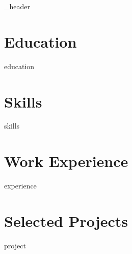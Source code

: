 \documentclass[letter,10pt]{article}
\author{Nicholas Pysklywec}
\begin{document}
{_header}
\vspace*{10pt}

\section{Education}
{education}
\vspace*{10pt}

\section{Skills}
\vspace*{3pt}
{skills}
\vspace*{10pt}
\section{Work Experience}
{experience}
\vspace*{10pt}

\newpage 

\section{Selected Projects}
\vspace*{3pt}
{project}
\vspace*{10pt}
\end{document}
